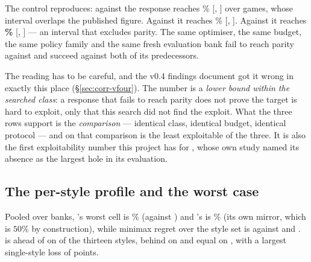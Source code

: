 The control reproduces: against \vfour{} the response reaches \vsixLbrFour\%
[\vsixLbrFourLo, \vsixLbrFourHi] over \vsixLbrFourN{} games, whose interval overlaps the published
figure. Against \vfive{} it reaches \vsixLbrFive\% [\vsixLbrFiveLo, \vsixLbrFiveHi]. Against
\vsix{} it reaches \textbf{\vsixLbrSix\%} [\vsixLbrSixLo, \vsixLbrSixHi] --- an interval that
excludes parity. The same optimiser, the same budget, the same policy family and the same fresh
evaluation bank fail to reach parity against \vsix{} and succeed against both of its predecessors.

The reading has to be careful, and the v0.4 findings document got it wrong in exactly this place
(\S\ref{sec:corr-vfour}). The number is a \emph{lower bound within the searched class}: a response
that fails to reach parity does not prove the target is hard to exploit, only that this search did
not find the exploit. What the three rows support is the \emph{comparison} --- identical class,
identical budget, identical protocol --- and on that comparison \vsix{} is the least exploitable of
the three. It is also the first exploitability number this project has for \vfive{}, whose own
study named its absence as the largest hole in its evaluation.

\subsection{The per-style profile and the worst case}
\label{sec:results-lbr}

\begin{table}[t]\centering
\caption{Per-opponent win rate over the full style set, pooled over \vsixPoolBanks{} disjoint seed
banks (515253, 90210, 424242), six rotations per cell. The headline is the \emph{minimum}, not the
mean. Minimax regret is measured against the best of the three arms on each opponent and is
therefore relative; \S\ref{sec:limitations} states what it is carried by.}
\label{tab:perstyle}

\end{table}

Pooled over \vsixPoolBanks{} banks, \vsix{}'s worst cell is \vsixPoolWorstSix\% (against
\vsixPoolWorstOppSix{}) and \vfive{}'s is \vsixPoolWorstFive\% (its own mirror, which is
$50\%$ by construction), while minimax regret over the style set is \vsixPoolRegretSix{} against
\vsixPoolRegretFive{} and \vsixPoolRegretFour{}. \vsix{} is ahead of \vfive{} on \vsixPoolAhead{} of the thirteen styles, behind on
\vsixPoolBehind{} and equal on \vsixPoolTied{}, with a largest single-style loss of
\vsixPoolWorstLoss{} points.

